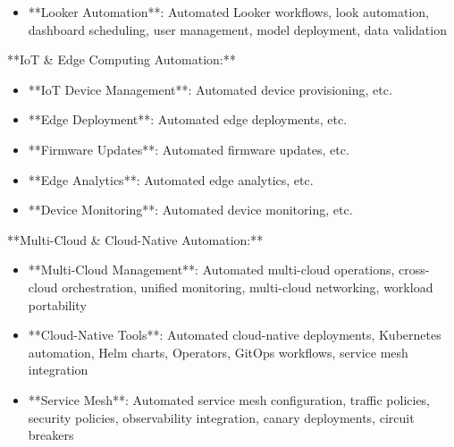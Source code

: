 \documentclass[11pt,a4paper]{article}
\begin{document}
\begin{itemize}
\item **Looker Automation**: Automated Looker workflows, look automation, dashboard scheduling, user management, model deployment, data validation
\end{itemize}

**IoT \& Edge Computing Automation:**

\begin{itemize}
\item **IoT Device Management**: Automated device provisioning, etc.
\end{itemize}

\begin{itemize}
\item **Edge Deployment**: Automated edge deployments, etc.
\end{itemize}

\begin{itemize}
\item **Firmware Updates**: Automated firmware updates, etc.
\end{itemize}

\begin{itemize}
\item **Edge Analytics**: Automated edge analytics, etc.
\end{itemize}

\begin{itemize}
\item **Device Monitoring**: Automated device monitoring, etc.
\end{itemize}

**Multi-Cloud \& Cloud-Native Automation:**

\begin{itemize}
\item **Multi-Cloud Management**: Automated multi-cloud operations, cross-cloud orchestration, unified monitoring, multi-cloud networking, workload portability
\end{itemize}

\begin{itemize}
\item **Cloud-Native Tools**: Automated cloud-native deployments, Kubernetes automation, Helm charts, Operators, GitOps workflows, service mesh integration
\end{itemize}

\begin{itemize}
\item **Service Mesh**: Automated service mesh configuration, traffic policies, security policies, observability integration, canary deployments, circuit breakers
\end{itemize}
\end{document}
